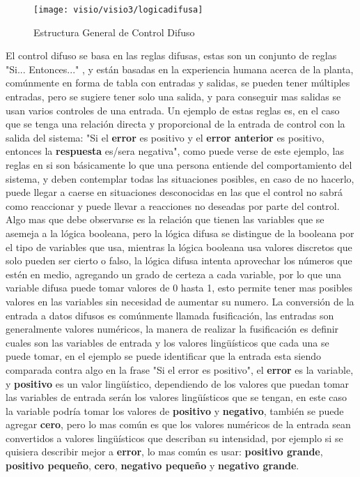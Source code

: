 \begin{figure}[h]
	\centering
	\texttt{[image: visio/visio3/logicadifusa]}
	\caption{Estructura General de Control Difuso}
	\label{fig:logicadifusa}
\end{figure}

El control difuso se basa en las reglas difusas, estas son un conjunto de reglas "Si... Entonces..." , y están basadas en la experiencia humana acerca de la planta, comúnmente en forma de tabla con entradas y salidas, se pueden tener múltiples entradas, pero se sugiere tener solo una salida, y para conseguir mas salidas se usan varios controles de una entrada. Un ejemplo de estas reglas es, en el caso que se tenga una relación directa y proporcional de la entrada de control con la salida del sistema: "Si el \textbf{error} es positivo y el \textbf{error anterior} es positivo, entonces la \textbf{respuesta} es/sera negativa", como puede verse de este ejemplo, las reglas en si son básicamente lo que una persona entiende del comportamiento del sistema, y deben contemplar todas las situaciones posibles, en caso de no hacerlo, puede llegar a caerse en situaciones desconocidas en las que el control no sabrá como reaccionar y puede llevar a reacciones no deseadas por parte del control. Algo mas que debe observarse es la relación que tienen las variables que se asemeja a la lógica booleana, pero la lógica difusa se distingue de la booleana por el tipo de variables que usa, mientras la lógica booleana usa valores discretos que solo pueden ser cierto o falso, la lógica difusa intenta aprovechar los números que estén en medio, agregando un grado de certeza a cada variable, por lo que una variable difusa puede tomar valores de 0 hasta 1, esto permite tener mas posibles valores en las variables sin necesidad de aumentar su numero.
La conversión de la entrada a datos difusos es comúnmente llamada  fusificación, las entradas son generalmente valores numéricos, la manera de realizar la fusificación es definir cuales son las variables de entrada y los valores lingüísticos que cada una se puede tomar, en el ejemplo se puede identificar que la entrada esta siendo comparada contra algo en la frase "Si el error es positivo", el \textbf{error} es la variable, y \textbf{positivo} es un valor lingüístico, dependiendo de los valores que puedan tomar las variables de entrada serán los valores lingüísticos que se tengan, en este caso la variable podría tomar los valores de \textbf{positivo} y \textbf{negativo}, también se puede agregar \textbf{cero}, pero lo mas común es que los valores numéricos de la entrada sean convertidos a valores lingüísticos que describan su intensidad, por ejemplo si se quisiera describir mejor a \textbf{error}, lo mas común es usar: \textbf{positivo grande},  \textbf{positivo pequeño}, \textbf{cero}, \textbf{negativo pequeño} y \textbf{negativo grande}. 
